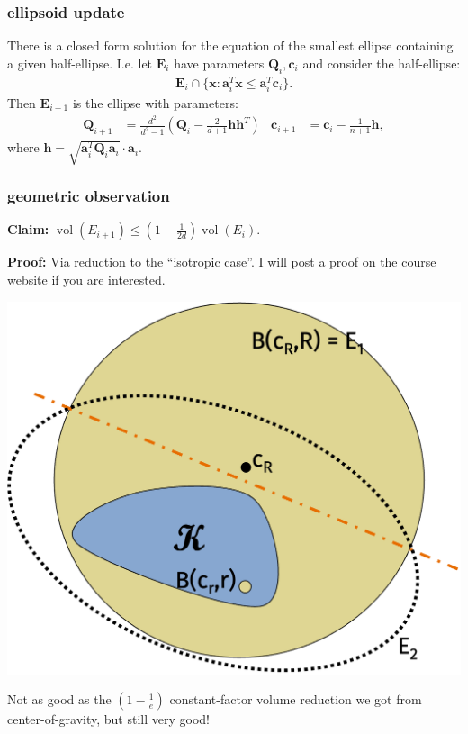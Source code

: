 \documentclass[compress]{beamer}
\newcommand{\bv}[1]{\mathbf{#1}}
\DeclareMathOperator{\vol}{vol}
\begin{document}
\begin{frame}
	\frametitle{ellipsoid update}
	There is a closed form solution for the equation of the smallest ellipse containing a given half-ellipse. I.e. let $\bv{E}_i$ have parameters $\bv{Q}_i,\bv{c}_i$ and consider the half-ellipse:
	\begin{align*}
		\bv{E}_i \cap \{\bv{x}: \bv{a}_i^T\bv{x} \leq \bv{a}_i^T\bv{c}_i\}. 
	\end{align*}
Then $\bv{E}_{i+1}$ is the ellipse with parameters:
\begin{align*}
	\bv{Q}_{i+1} &= \frac{d^2}{d^2 - 1}\left(\bv{Q}_{i} - \frac{2}{d+1} \bv{h}\bv{h}^T \right) & \bv{c}_{i+1}& = \bv{c}_{i} - \frac{1}{n+1}\bv{h},
\end{align*}
where $\bv{h} = \sqrt{\bv{a}_i^T\bv{Q}_i\bv{a}_i}\cdot \bv{a}_i$. 
	
\end{frame}


\begin{frame}[t]
	\frametitle{geometric observation}
	\textbf{Claim:} $\vol(E_{i+1}) \leq (1-\frac{1}{2d})\vol(E_i)$.
	
	\textbf{Proof:} Via reduction to the ``isotropic case''. I will post a proof on the course website if you are interested. 
	\vspace{-.5em}
	\begin{center}
		\includegraphics[width=.5\textwidth]{ellipsoid2.png}
	\end{center}
	\vspace{-.5em}
Not as good as the $(1-\frac{1}{e})$ constant-factor volume reduction we got from center-of-gravity, but still very good! 
\end{frame}
\end{document}

